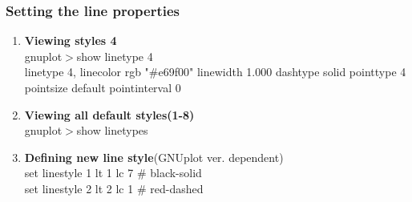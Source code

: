 \documentclass{beamer}
\begin{document}
		\begin{frame}
			\frametitle{Setting the line properties}
			\scriptsize
			\begin{enumerate}
				\item \textbf{Viewing styles 4 }\\
					gnuplot$>$show linetype 4\\ 
				    linetype 4,  linecolor rgb "\#e69f00"  linewidth 1.000 dashtype solid pointtype 4 pointsize default pointinterval 0\\
				    
				\item \textbf{Viewing all default styles(1-8)} \\ 
					gnuplot$>$show linetypes\\				    
				
				\item \textbf{Defining new line style}(GNUplot ver. dependent) \\			
					set linestyle  1 lt 1 lc 7 \hspace{1cm}\# black-solid\\
					set linestyle  2 lt 2 lc 1 \hspace{1cm}\# red-dashed
				
			\end{enumerate}
		
		\end{frame}				
		
\end{document}
